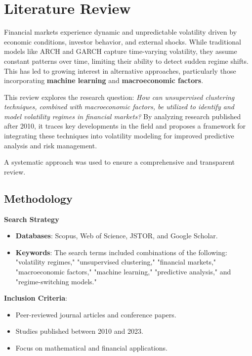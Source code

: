 \chapter{Literature Review}

Financial markets experience dynamic and unpredictable volatility driven by economic conditions, investor behavior, and external shocks. While traditional models like ARCH and GARCH capture time-varying volatility, they assume constant patterns over time, limiting their ability to detect sudden regime shifts. This has led to growing interest in alternative approaches, particularly those incorporating \textbf{machine learning} and \textbf{macroeconomic factors}.

This review explores the research question: \textit{How can unsupervised clustering techniques, combined with macroeconomic factors, be utilized to identify and model volatility regimes in financial markets?} By analyzing research published after 2010, it traces key developments in the field and proposes a framework for integrating these techniques into volatility modeling for improved predictive analysis and risk management.

A systematic approach was used to ensure a comprehensive and transparent review.

\section{Methodology}

\textbf{Search Strategy}

\begin{itemize}

\item \textbf{Databases}: Scopus, Web of Science, JSTOR, and Google Scholar.

\item \textbf{Keywords}: The search terms included combinations of the following: "volatility regimes," "unsupervised clustering," "financial markets," "macroeconomic factors," "machine learning," "predictive analysis," and "regime-switching models."

\end{itemize} 

\textbf{Inclusion Criteria}:
\begin{itemize} 
\item Peer-reviewed journal articles and conference papers.
\item Studies published between 2010 and 2023.
\item Focus on mathematical and financial applications.
\end{itemize}

